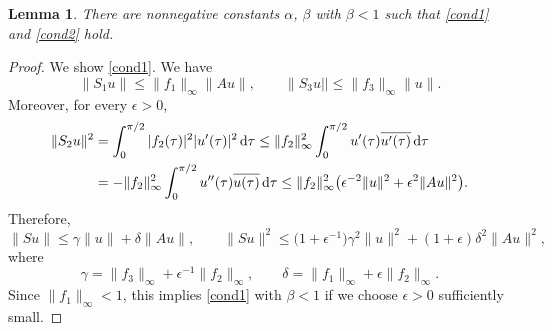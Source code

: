 \documentclass[pdftex]{sigma}
\newtheorem{Lemma}[thm]{Lemma}
\numberwithin{equation}{section}
\begin{document}
\begin{Lemma}
There are nonnegative constants $\alpha$, $\beta$ with $\beta<1$ such that
\eqref{cond1} and \eqref{cond2} hold.
\end{Lemma}
\begin{proof}
We show \eqref{cond1}.
We have
\begin{equation*}%
\|S_1u\|\le \|f_1\|_\infty\|Au\|,\qquad \|S_3u||\le \|f_3\|_\infty \|u\|.
\end{equation*}
Moreover, for every $\epsilon>0$,
\begin{align*}
\|S_2u\|^2&=\int_0^{\pi/2} |f_2(\tau)|^2 |u'(\tau)|^2\,{\rm d}\tau\le \|f_2\|_\infty^2\int_0^{\pi/2} u'(\tau)\overline{u'(\tau)}\,{\rm d}\tau\\
&= -\|f_2\|_\infty^2\int_0^{\pi/2} u''(\tau)\overline{u(\tau)}\,{\rm d}\tau \le \|f_2\|_\infty^2\bigl(\epsilon^{-2}\|u\|^2+\epsilon^2\|Au\|^2\bigr).
\end{align*}
Therefore,
\[
\|Su\|\le \gamma\|u\|+\delta\|Au\|,\qquad \|Su\|^2\le \bigl(1+\epsilon^{-1}\bigr)\gamma^2\|u\|^2+(1+\epsilon)\delta^2\|Au\|^2,
\]
where
\[
\gamma= \|f_3\|_\infty+\epsilon^{-1}\|f_2\|_\infty,\qquad
\delta= \|f_1\|_\infty+\epsilon\|f_2\|_\infty.
\]
Since $\|f_1\|_\infty<1$, this implies \eqref{cond1} with $\beta<1$ if we choose $\epsilon>0$ sufficiently small.


\end{proof}
\end{document}
